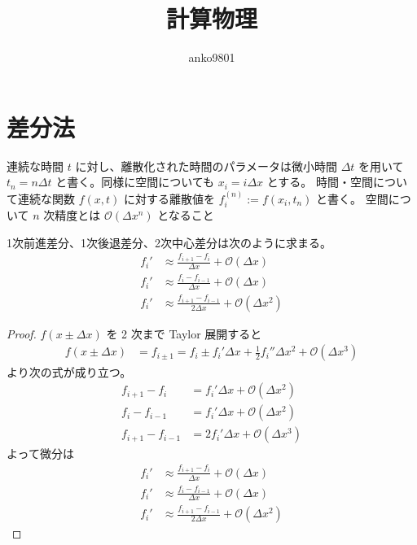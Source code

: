 \documentclass[uplatex,diffipdfmx,a4paper,11pt]{jlreq}
\title{計算物理}
\author{anko9801}
\begin{document}
\maketitle
\tableofcontents
\clearpage

\section{差分法}
\begin{definition}
  連続な時間 $t$ に対し、離散化された時間のパラメータは微小時間 $\Delta t$ を用いて $t_n = n\Delta t$ と書く。同様に空間についても $x_i = i\Delta x$ とする。
  時間・空間について連続な関数 $f(x, t)$ に対する離散値を $f_i^{(n)} := f(x_i, t_n)$ と書く。
  空間について $n$ 次精度とは $\mathcal{O}(\Delta x^n)$ となること
\end{definition}



\begin{theorem}[1階微分の差分公式]
  1次前進差分、1次後退差分、2次中心差分は次のように求まる。
  \begin{align}
    f_i' & \approx \frac{f_{i+1} - f_i}{\Delta x} + \mathcal{O}(\Delta x)        \\
    f_i' & \approx \frac{f_i - f_{i-1}}{\Delta x} + \mathcal{O}(\Delta x)        \\
    f_i' & \approx \frac{f_{i+1} - f_{i-1}}{2\Delta x} + \mathcal{O}(\Delta x^2)
  \end{align}
\end{theorem}
\begin{proof}
  $f(x \pm \Delta x)$ を 2 次まで Taylor 展開すると
  \begin{align}
    f(x \pm \Delta x) & = f_{i \pm 1} = f_i \pm f_i'\Delta x + \frac{1}{2}f_i''\Delta x^2 + \mathcal{O}(\Delta x^3)
  \end{align}
  より次の式が成り立つ。
  \begin{align}
    f_{i + 1} - f_i       & = f_i'\Delta x + \mathcal{O}(\Delta x^2)  \\
    f_i - f_{i - 1}       & = f_i'\Delta x + \mathcal{O}(\Delta x^2)  \\
    f_{i + 1} - f_{i - 1} & = 2f_i'\Delta x + \mathcal{O}(\Delta x^3)
  \end{align}
  よって微分は
  \begin{align}
    f_i' & \approx \frac{f_{i+1} - f_i}{\Delta x} + \mathcal{O}(\Delta x)        \\
    f_i' & \approx \frac{f_i - f_{i-1}}{\Delta x} + \mathcal{O}(\Delta x)        \\
    f_i' & \approx \frac{f_{i+1} - f_{i-1}}{2\Delta x} + \mathcal{O}(\Delta x^2)
  \end{align}
\end{proof}
\end{document}
